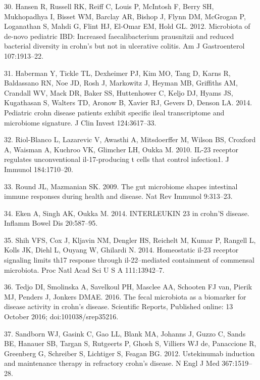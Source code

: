 \documentclass[12pt,]{article}
\begin{document}
\hypertarget{ref-hansen_pedsIBD_2012}{}
30. Hansen R, Russell RK, Reiff C, Louis P, McIntosh F, Berry SH,
Mukhopadhya I, Bisset WM, Barclay AR, Bishop J, Flynn DM, McGrogan P,
Loganathan S, Mahdi G, Flint HJ, El-Omar EM, Hold GL. 2012. Microbiota
of de-novo pediatric IBD: Increased faecalibacterium prausnitzii and
reduced bacterial diversity in crohn's but not in ulcerative colitis. Am
J Gastroenterol 107:1913--22.

\hypertarget{ref-haberman_pedsCD_2014}{}
31. Haberman Y, Tickle TL, Dexheimer PJ, Kim MO, Tang D, Karns R,
Baldassano RN, Noe JD, Rosh J, Markowitz J, Heyman MB, Griffiths AM,
Crandall WV, Mack DR, Baker SS, Huttenhower C, Keljo DJ, Hyams JS,
Kugathasan S, Walters TD, Aronow B, Xavier RJ, Gevers D, Denson LA.
2014. Pediatric crohn disease patients exhibit specific ileal
transcriptome and microbiome signature. J Clin Invest 124:3617--33.

\hypertarget{ref-Riol-Blanco_IL23microbiome_2010}{}
32. Riol-Blanco L, Lazarevic V, Awasthi A, Mitsdoerffer M, Wilson BS,
Croxford A, Waisman A, Kuchroo VK, Glimcher LH, Oukka M. 2010. IL-23
receptor regulates unconventional il-17-producing t cells that control
infection1. J Immunol 184:1710--20.

\hypertarget{ref-Round_IL23microbiome_2009}{}
33. Round JL, Mazmanian SK. 2009. The gut microbiome shapes intestinal
immune responses during health and disease. Nat Rev Immunol 9:313--23.

\hypertarget{ref-Eken_IL23CD_2014}{}
34. Eken A, Singh AK, Oukka M. 2014. INTERLEUKIN 23 in crohn'S disease.
Inflamm Bowel Dis 20:587--95.

\hypertarget{ref-Shih_IL23Th17_2014}{}
35. Shih VFS, Cox J, Kljavin NM, Dengler HS, Reichelt M, Kumar P,
Rangell L, Kolls JK, Diehl L, Ouyang W, Ghilardi N. 2014. Homeostatic
il-23 receptor signaling limits th17 response through il-22--mediated
containment of commensal microbiota. Proc Natl Acad Sci U S A
111:13942--7.

\hypertarget{ref-tedjo_CDactivity_2016}{}
36. Tedjo DI, Smolinska A, Savelkoul PH, Masclee AA, Schooten FJ van,
Pierik MJ, Penders J, Jonkers DMAE. 2016. The fecal microbiota as a
biomarker for disease activity in crohn's disease. Scientific Reports,
Published online: 13 October 2016; doi:101038/srep35216.

\hypertarget{ref-sandborn_ust_2012}{}
37. Sandborn WJ, Gasink C, Gao LL, Blank MA, Johanns J, Guzzo C, Sands
BE, Hanauer SB, Targan S, Rutgeerts P, Ghosh S, Villiers WJ de,
Panaccione R, Greenberg G, Schreiber S, Lichtiger S, Feagan BG. 2012.
Ustekinumab induction and maintenance therapy in refractory crohn's
disease. N Engl J Med 367:1519--28.
\end{document}
